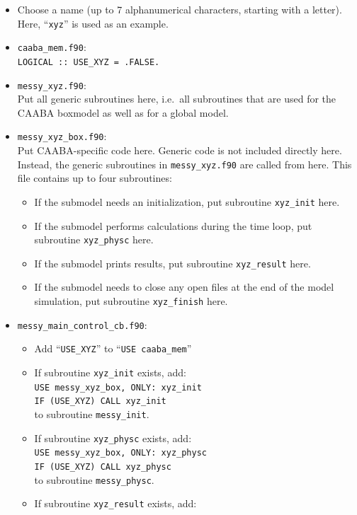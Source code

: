 \documentclass[twoside]{article}
\begin{document}
\begin{itemize}
\item Choose a name (up to 7 alphanumerical characters, starting with a
  letter). Here, ``\verb|xyz|'' is used as an example.
\item \verb|caaba_mem.f90|:\\
  \verb|LOGICAL :: USE_XYZ = .FALSE.|
\item \verb|messy_xyz.f90|:\\
  Put all generic subroutines here, i.e.\ all subroutines that are used
  for the CAABA boxmodel as well as for a global model.
\item \verb|messy_xyz_box.f90|:\\
  Put CAABA-specific code here. Generic code is not included directly
  here. Instead, the generic subroutines in \verb|messy_xyz.f90| are
  called from here. This file contains up to four subroutines:
  \begin{itemize}
  \item If the submodel needs an initialization, put subroutine
    \verb|xyz_init| here.
  \item If the submodel performs calculations during the time loop, put
    subroutine \verb|xyz_physc| here.
  \item If the submodel prints results, put subroutine \verb|xyz_result|
    here.
  \item If the submodel needs to close any open files at the end of the
    model simulation, put subroutine \verb|xyz_finish| here.
  \end{itemize}
\item \verb|messy_main_control_cb.f90|:
  \begin{itemize}
  \item Add ``\verb|USE_XYZ|'' to ``\verb|USE caaba_mem|''
  \item If subroutine \verb|xyz_init| exists, add:\\
    \verb|USE messy_xyz_box, ONLY: xyz_init|\\
    \verb|IF (USE_XYZ) CALL xyz_init|\\
    to subroutine \verb|messy_init|.
  \item If subroutine \verb|xyz_physc| exists, add:\\
    \verb|USE messy_xyz_box, ONLY: xyz_physc|\\
    \verb|IF (USE_XYZ) CALL xyz_physc|\\
    to subroutine \verb|messy_physc|.
  \item If subroutine \verb|xyz_result| exists, add:\\

\end{itemize}
\end{itemize}
\end{document}
